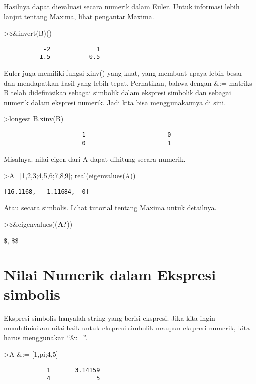 \documentclass[
]{book}
\begin{document}
Hasilnya dapat dievaluasi secara numerik dalam Euler. Untuk informasi lebih lanjut tentang Maxima, lihat pengantar Maxima.

\textgreater\$\&invert(B)()

\begin{verbatim}
           -2             1 
          1.5          -0.5 
\end{verbatim}

Euler juga memiliki fungsi xinv() yang kuat, yang membuat upaya lebih besar dan mendapatkan hasil yang lebih tepat. Perhatikan, bahwa dengan \&:= matriks B telah didefinisikan sebagai simbolik dalam ekspresi simbolik dan sebagai numerik dalam ekspresi numerik. Jadi kita bisa menggunakannya di sini.

\textgreater longest B.xinv(B)

\begin{verbatim}
                      1                       0 
                      0                       1 
\end{verbatim}

Misalnya. nilai eigen dari A dapat dihitung secara numerik.

\textgreater A={[}1,2,3;4,5,6;7,8,9{]}; real(eigenvalues(A))

\begin{verbatim}
[16.1168,  -1.11684,  0]
\end{verbatim}

Atau secara simbolis. Lihat tutorial tentang Maxima untuk detailnya.

\textgreater\$\&eigenvalues((\textbf{A?}))

\$\left[ \left[ \frac{15-3\,\sqrt{33}}{2} , \frac{3\,\sqrt{33}+15}{2}   , 0 \right]  , \left[ 1 , 1 , 1 \right]  \right{]} \$\$

\section{Nilai Numerik dalam Ekspresi simbolis}\label{nilai-numerik-dalam-ekspresi-simbolis}

Ekspresi simbolis hanyalah string yang berisi ekspresi. Jika kita ingin mendefinisikan nilai baik untuk ekspresi simbolik maupun ekspresi numerik, kita harus menggunakan ``\&:=''.

\textgreater A \&:= {[}1,pi;4,5{]}

\begin{verbatim}
            1       3.14159 
            4             5 
\end{verbatim}
\end{document}
